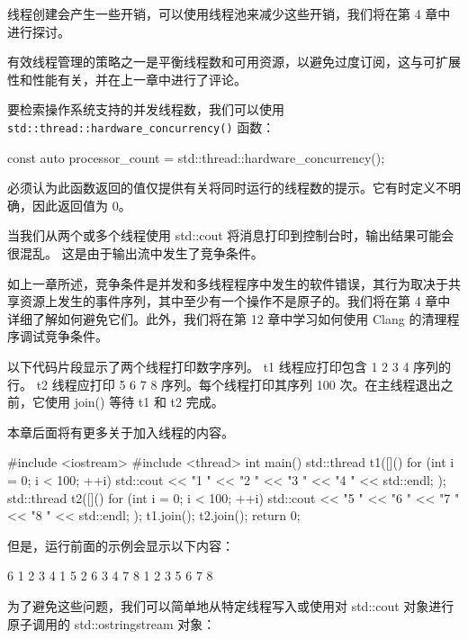 线程创建会产生一些开销，可以使用线程池来减少这些开销，我们将在第 4 章中进行探讨。


有效线程管理的策略之一是平衡线程数和可用资源，以避免过度订阅，这与可扩展性和性能有关，并在上一章中进行了评论。

要检索操作系统支持的并发线程数，我们可以使用 \verb|std::thread::hardware_concurrency()| 函数：

\begin{cpp}
const auto processor_count = std::thread::hardware_concurrency();
\end{cpp}

必须认为此函数返回的值仅提供有关将同时运行的线程数的提示。它有时定义不明确，因此返回值为 0。


当我们从两个或多个线程使用 std::cout 将消息打印到控制台时，输出结果可能会很混乱。
这是由于输出流中发生了竞争条件。

如上一章所述，竞争条件是并发和多线程程序中发生的软件错误，其行为取决于共享资源上发生的事件序列，其中至少有一个操作不是原子的。我们将在第 4 章中详细了解如何避免它们。此外，我们将在第 12 章中学习如何使用 Clang 的清理程序调试竞争条件。

以下代码片段显示了两个线程打印数字序列。 t1 线程应打印包含 1 2 3 4 序列的行。 t2 线程应打印 5 6 7 8 序列。每个线程打印其序列 100 次。在主线程退出之前，它使用 join() 等待 t1 和 t2 完成。

本章后面将有更多关于加入线程的内容。

\begin{cpp}
#include <iostream>
#include <thread>
int main() {
    std::thread t1([]() {
        for (int i = 0; i < 100; ++i) {
            std::cout << "1 " << "2 " << "3 " << "4 "
            << std::endl;
        }
    });
    std::thread t2([]() {
        for (int i = 0; i < 100; ++i) {
            std::cout << "5 " << "6 " << "7 " << "8 "
            << std::endl;
        }
    });
    t1.join();
    t2.join();
    return 0;
}
\end{cpp}

但是，运行前面的示例会显示以下内容：

\begin{shell}
6 1 2 3 4
1 5 2 6 3 4 7 8
1 2 3 5 6 7 8
\end{shell}

为了避免这些问题，我们可以简单地从特定线程写入或使用对 std::cout 对象进行原子调用的 std::ostringstream 对象：

